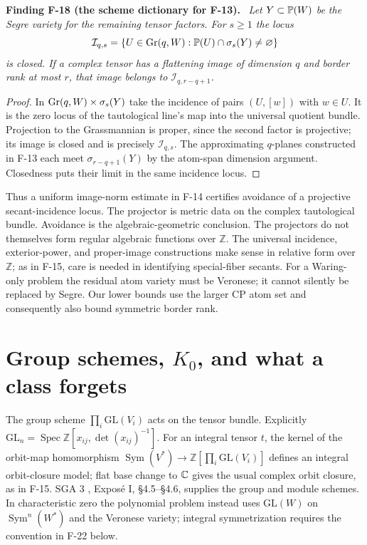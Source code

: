 \documentclass[11pt]{article}
\newcommand{\Z}{\mathbb Z}\newcommand{\Q}{\mathbb Q}
\newcommand{\GL}{\mathrm{GL}}\newcommand{\Sym}{\operatorname{Sym}}
\newcommand{\Spec}{\operatorname{Spec}}\newcommand{\rank}{\operatorname{rank}}
\newenvironment{finding}[2]{\par\medskip\noindent\textbf{Finding #1 (#2).}\ \itshape}{\par\medskip}
\begin{document}
\begin{finding}{F-18}{the scheme dictionary for F-13}
Let $Y\subset\mathbb P(W)$ be the Segre variety for the remaining
tensor factors. For $s\geq1$ the locus
\[
 \mathcal I_{q,s}
 =\{U\in\operatorname{Gr}(q,W):\mathbb P(U)\cap\sigma_s(Y)\ne\varnothing\}
\]
is closed. If a complex tensor has a flattening image of dimension $q$
and border rank at most $r$, that image belongs to
$\mathcal I_{q,r-q+1}$.
\end{finding}
\begin{proof}
In $\operatorname{Gr}(q,W)\times\sigma_s(Y)$ take the incidence of pairs
$(U,[w])$ with $w\in U$. It is the zero locus of the
tautological line's map into the universal quotient bundle.
Projection to the Grassmannian is proper, since the second
factor is projective; its image is closed and is precisely
$\mathcal I_{q,s}$.
The approximating $q$-planes constructed in F-13 each meet
$\sigma_{r-q+1}(Y)$ by the atom-span dimension argument.
Closedness puts their limit in the same incidence locus.
\end{proof}
Thus a uniform image-norm estimate in F-14 certifies avoidance
of a projective secant-incidence locus. The projector is metric
data on the complex tautological bundle. Avoidance is the
algebraic-geometric conclusion. The projectors do not themselves
form regular algebraic functions over $\Z$.
The universal incidence, exterior-power, and proper-image
constructions make sense in relative form over $\Z$; as in F-15,
care is needed in identifying special-fiber secants.
For a Waring-only problem the residual atom variety must be
Veronese; it cannot silently be replaced by Segre.
Our lower bounds use the larger CP atom set and consequently
also bound symmetric border rank.

\section{Group schemes, \texorpdfstring{$K_0$}{K0}, and what a class forgets}
The group scheme $\prod_i\GL(V_i)$ acts on the tensor bundle.
Explicitly $\GL_n=\Spec\Z[x_{ij},\det(x_{ij})^{-1}]$.
For an integral tensor $t$, the kernel of the orbit-map
homomorphism $\Sym(V^*)\to\Z[\prod_i\GL(V_i)]$ defines an
integral orbit-closure model; flat base change to $\mathbb C$ gives
the usual complex orbit closure, as in F-15.
SGA 3 \cite{SGA3}, Expos\'e I, \S4.5--\S4.6, supplies
the group and module schemes.
In characteristic zero the polynomial problem instead uses
$\GL(W)$ on $\Sym^n(W^*)$ and the Veronese variety; integral
symmetrization requires the convention in F-22 below.
\end{document}

